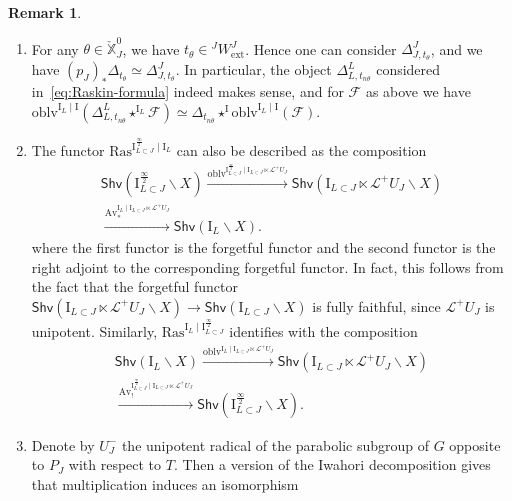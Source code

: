 \documentclass[11pt]{amsart}
\numberwithin{equation}{section}
\theoremstyle{plain}
\theoremstyle{definition}
\newtheorem{rmk}[thm]{Remark}
\newcommand{\sF}{{\mathcal F}}
\newcommand{\I}{{\mathrm I}}
\newcommand{\sL}{{\mathcal L}}
\newcommand{\X}{{\mathbb X}}
\newcommand{\Xd}{\check{\X}}
\newcommand{\semi}{{{\frac{\infty}{2}}}}
\newcommand{\oblv}{\mathrm{oblv}}
\newcommand{\Av}{\mathrm{Av}}
\newcommand{\ex}{\mathrm{ext}}
\newcommand{\Shv}{\mathsf{Shv}}
\newcommand{\Ras}{\mathrm{Ras}}
\begin{document}
\begin{rmk}
\label{rmk:Raskin}
\begin{enumerate}
\item
\label{it:ttheta-minimal}
For any $\theta \in \Xd_J^0$, we have $t_\theta \in {}^J W_\ex^J$. Hence one can consider $\Delta^J_{J,t_\theta}$, and we have $(p_J)_* \Delta_{t_\theta} \simeq \Delta^J_{J,t_\theta}$. In particular, the object $\Delta^L_{L,t_{n\theta}}$ considered in~\eqref{eq:Raskin-formula} indeed makes sense, and for $\sF$ as above we have $\oblv^{\I_L \mid \I}(\Delta^L_{L,t_{n\theta}} \star^{\I_L} \sF) \simeq \Delta_{t_{n\theta}} \star^{\I} \oblv^{\I_L \mid \I}(\sF)$.
\item
\label{it:rmk-Raskin-2}
The functor $\Ras^{\I_{L \subset J}^{\semi} \mid \I_L}$ can also be described as the composition
\begin{multline*}
\Shv \left( \I_{L \subset J}^{\semi} \backslash X \right) \xrightarrow{\oblv^{\I_{L \subset J}^{\semi} \mid \I_{L \subset J} \ltimes \sL^+ U_J}} 
\Shv \left( \I_{L \subset J} \ltimes \sL^+ U_J \backslash X \right) \\
\xrightarrow{\Av_*^{\I_L \mid \I_{L \subset J} \ltimes \sL^+ U_J}}
\Shv \left( \I_L \backslash X \right). 
\end{multline*}
where the first functor is the forgetful functor and the second functor is the right adjoint to the corresponding forgetful functor. In fact, this follows from the fact that the forgetful functor $\Shv \left( \I_{L \subset J} \ltimes \sL^+ U_J \backslash X \right) \to \Shv \left( \I_{L \subset J} \backslash X \right)$ is fully faithful, since $\sL^+ U_J$ is unipotent. Similarly, $\Ras^{\I_L \mid \I_{L \subset J}^{\semi}}$ identifies with the composition
\begin{multline*}
\Shv \left( \I_L \backslash X \right) \xrightarrow{\oblv^{\I_L \mid \I_{L \subset J} \ltimes \sL^+ U_J}}
\Shv \left( \I_{L \subset J} \ltimes \sL^+ U_J \backslash X \right) \\
\xrightarrow{\Av_!^{\I_{L \subset J}^{\semi} \mid \I_{L \subset J} \ltimes \sL^+ U_J}} 
\Shv \left( \I_{L \subset J}^{\semi} \backslash X \right). 
\end{multline*}
\item
\label{it:rmk-Raskin-3}
Denote by $U_J^-$ the unipotent radical of the parabolic subgroup of $G$ opposite to $P_J$ with respect to $T$. Then
a version of the Iwahori decomposition gives that multiplication induces an isomorphism
\begin{equation}
\label{eqn:decomposition-IL-J}

\end{equation}
\end{enumerate}
\end{rmk}
\end{document}
